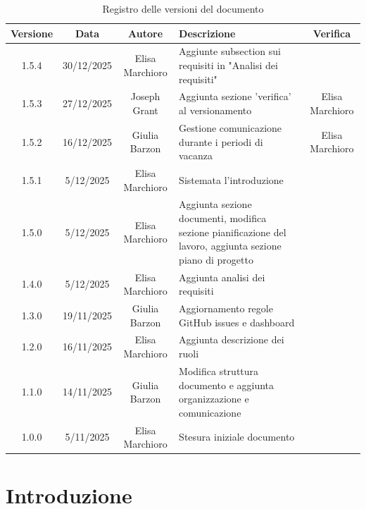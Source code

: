 \documentclass[11pt,a4paper]{article}
\begin{document}
\begin{table}[H]
    \centering
    \begin{tabular}{|c|c|c|>{\raggedright\arraybackslash}p{}|c|}
        \hline
        \textbf{Versione} & \textbf{Data} & \textbf{Autore} & \textbf{Descrizione} & \textbf{Verifica} \\
        \hline
        1.5.4 & 30/12/2025 & Elisa Marchioro & Aggiunte subsection sui requisiti in "Analisi dei requisiti" & \\ \hline
        1.5.3 & 27/12/2025 & Joseph Grant & Aggiunta sezione 'verifica' al versionamento & Elisa Marchioro\\ \hline
        1.5.2 & 16/12/2025 & Giulia Barzon & Gestione comunicazione durante i periodi di vacanza & Elisa Marchioro\\
        \hline
        1.5.1 & 5/12/2025 & Elisa Marchioro & Sistemata l'introduzione & \\
        \hline
        1.5.0 & 5/12/2025 & Elisa Marchioro & Aggiunta sezione documenti, modifica sezione pianificazione del lavoro, aggiunta sezione piano di progetto & \\
        \hline
        1.4.0 & 5/12/2025 & Elisa Marchioro & Aggiunta analisi dei requisiti & \\
        \hline
        1.3.0 & 19/11/2025 & Giulia Barzon & Aggiornamento regole GitHub issues e dashboard & \\
        \hline
        1.2.0 & 16/11/2025 & Elisa Marchioro & Aggiunta descrizione dei ruoli & \\
        \hline
        1.1.0 & 14/11/2025 & Giulia Barzon & Modifica struttura documento e aggiunta organizzazione e comunicazione & \\
        \hline
        1.0.0 & 5/11/2025 & Elisa Marchioro & Stesura iniziale documento & \\
        \hline
    \end{tabular}
    \caption{Registro delle versioni del documento}
    \label{tab:versionamento}
\end{table}

\newpage

\tableofcontents
\newpage

\section{Introduzione}
\end{document}
